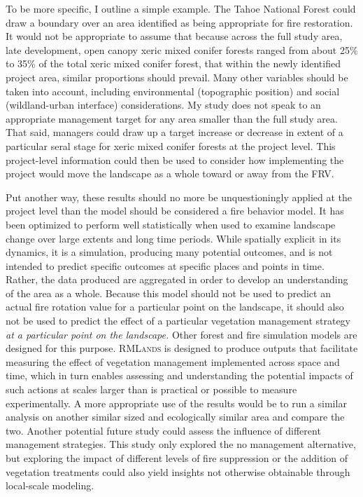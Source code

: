 To be more specific, I outline a simple example. The Tahoe National Forest could draw a boundary over an area identified as being appropriate for fire restoration. It would not be appropriate to assume that because across the full study area, late development, open canopy xeric mixed conifer forests ranged from about 25\% to 35\% of the total xeric mixed conifer forest, that within the newly identified project area, similar proportions should prevail. Many other variables should be taken into account, including environmental (topographic position) and social (wildland-urban interface) considerations. My study does not speak to an appropriate management target for any area smaller than the full study area. That said, managers could draw up a target increase or decrease in extent of a particular seral stage for xeric mixed conifer forests at the project level. This project-level information could then be used to consider how implementing the project would move the landscape as a whole toward or away from the FRV. 

Put another way, these results should no more be unquestioningly applied at the project level than the model should be considered a fire behavior model. It has been optimized to perform well statistically when used to examine landscape change over large extents and long time periods. While spatially explicit in its dynamics, it is a simulation, producing many potential outcomes, and is not intended to predict specific outcomes at specific places and points in time. Rather, the data produced are aggregated in order to develop an understanding of the area as a whole. Because this model should not be used to predict an actual fire rotation value for a particular point on the landscape, it should also not be used to predict the effect of a particular vegetation management strategy \emph{at a particular point on the landscape.} Other forest and fire simulation models are designed for this purpose. \textsc{RMLands} is designed to produce outputs that facilitate measuring the effect of vegetation management implemented across space and time, which in turn enables assessing and understanding the potential impacts of such actions at scales larger than is practical or possible to measure experimentally.  A more appropriate use of the results would be to run a similar analysis on another similar sized and ecologically similar area and compare the two. Another potential future study could assess the influence of different management strategies. This study only explored the no management alternative, but exploring the impact of different levels of fire suppression or the addition of vegetation treatments could also yield insights not otherwise obtainable through local-scale modeling.


